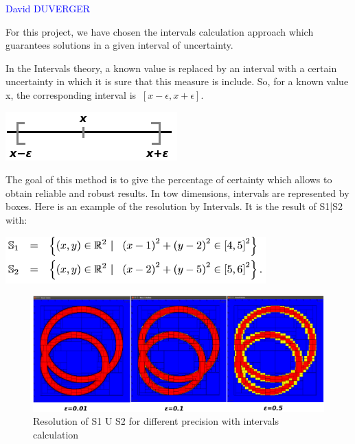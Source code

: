     	\vspace{0.5 cm}
	
	\textcolor{blue} {David DUVERGER}
	
	\vspace{0.3 cm}
	
	 For this project, we have chosen the intervals calculation    approach which guarantees solutions in a given interval of uncertainty.

	\vspace{0.5 cm}
	
	In the Intervals theory, a known value is replaced by an interval with a certain uncertainty in which it is sure that this measure is include. So, for a known value x, the corresponding interval is $\ [x-\epsilon, x+\epsilon] $.


    \begin{center} \includegraphics[scale=0.8]{Interval.png} \end{center}
    
    The goal of this method is to give the percentage of certainty which allows to obtain reliable and robust results. In tow dimensions, intervals are represented by boxes. Here is an example of the resolution by Intervals. It is the result of S1|S2 with:
    
    	\vspace{0.6 cm}
    	

    \begin{center} \includegraphics{Formule1.png} \end{center}
    
    \begin{figure}[!h] 
    \center
    	\includegraphics[scale=0.4]{Boxes.png} 
    	\caption{Resolution of S1 U S2 for different precision with intervals calculation } 
    \label{S1 U S2}
	\end{figure} 

